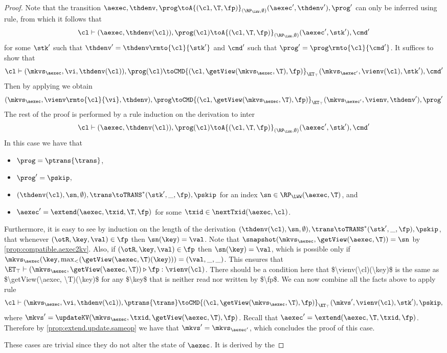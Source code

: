 \begin{proof}
Note that the transition 
$\aexec, \thdenv, \prog \toA{(\cl, \T, \fp)}_{(\RP_{\LWW}, \emptyset)} (\aexec', \thdenv'), \prog'$ 
can only be inferred using  rule, 
from which it follows that 
\[
    \cl \vdash (\aexec, \thdenv(\cl)), \prog(\cl) 
    \toA{(\cl, \T, \fp)}_{(\RP_{\LWW}, \emptyset)} (\aexec' ,\stk'), \cmd'
\]
for some $\stk'$ such that $\thdenv' = \thdenv\rmto{\cl}{\stk'}$ 
and $\cmd'$ such that $\prog' = \prog\rmto{\cl}{\cmd'}$.
It suffices to show that 
\[
    \cl \vdash (\mkvs_\aexec, \vi, \thdenv(\cl)), \prog(\cl) 
   \toCMD{(\cl, \getView(\mkvs_{\aexec}, \T), \fp)}_{\ET_{\top}} 
    (\mkvs_{\aexec'}, \vienv(\cl), \stk'), \cmd'
\]
Then by applying  we obtain 
\[
    (\mkvs_{\aexec}, \vienv\rmto{\cl}{\vi}, \thdenv), \prog 
    \toCMD{(\cl, \getView(\mkvs_{\aexec}, \T), \fp)}_{\ET_{\top}} 
    (\mkvs_{\aexec'}, \vienv, \thdenv'), \prog'
\]
The rest of the proof is performed by a rule induction on the derivation to inter 
\[ 
    \cl \vdash (\aexec, \thdenv(\cl)), \prog(\cl) 
    \toA{(\cl, \T, \fp)}_{(\RP_{\LWW}, \emptyset)} (\aexec', \stk'), \cmd'
\]
In this case we have that 
\begin{itemize}
    \item $\prog = \ptrans{\trans}$, 
    \item $\prog' = \pskip$, 
    \item $(\thdenv(\cl), \sn, \emptyset), \trans \toTRANS^{\ast} (\stk', \_, \fp), \pskip$ for an index $\sn \in \RP_{\LWW}(\aexec, \T)$, and 
    \item $\aexec' = \extend(\aexec, \txid, \T, \fp)$ for some $\txid \in \nextTxid(\aexec, \cl)$. 
\end{itemize}
Furthermore, it is easy to see by induction on the length of the derivation 
$(\thdenv(\cl), \sn, \emptyset), \trans \toTRANS^{\ast} (\stk', \_, \fp), \pskip$, 
that whenever $(\otR, \key, \val) \in \fp$ then $\sn(\key) = \val$.
Note that $\snapshot(\mkvs_{\aexec}, \getView(\aexec, \T)) = \sn$ by \cref{prop:compatible.aexec2kv}.
Also, if $(\otR,\key, \val) \in \fp$ then $\sn(\key) = \val$, which is possible only if  
$\mkvs_{\aexec}(\key, \max_{<}(\getView(\aexec, \T)(\key))) = (\val, \_, \_)$.
This ensures that $\ET_{\top} \vdash (\mkvs_{\aexec}, \getView(\aexec, \T)) \triangleright \fp: \vienv(\cl)$. 
\ac{There should be a condition here that $\vienv(\cl)(\key)$ is the same as $\getView(\aexec, \T)(\key)$ 
for any $\key$ that is neither read nor written by $\fp$.} 
We can now combine all the facts above to apply rule 
\[
    \cl \vdash (\mkvs_{\aexec}, \vi, \thdenv(\cl)), \ptrans{\trans}
    \toCMD{(\cl, \getView(\mkvs_{\aexec}, \T), \fp)}_{\ET_{\top}} 
    (\mkvs', \vienv(\cl), \stk'), \pskip, 
\] 
where $\mkvs' = \updateKV(\mkvs_{\aexec}, \txid, \getView(\aexec, \T), \fp)$. 
Recall that $\aexec' = \extend(\aexec, \T, \txid, \fp)$. 
Therefore by \cref{prop:extend.update.sameop} we have that $\mkvs' = \mkvs_{\aexec'}$, 
which concludes the proof of this case.

These cases are trivial since they do not alter the state of \( \aexec \).
It is derived by the \ih
\end{proof}


